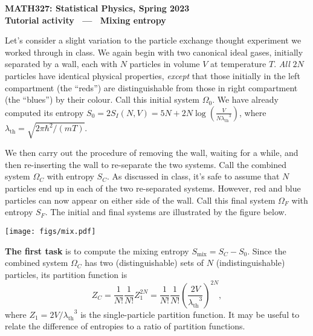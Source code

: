 \documentclass[12 pt]{article} %
\newcommand{\la}{\ensuremath{\lambda} }
\newcommand{\lath}{\ensuremath{\la_{\mathrm{th}}} }
\newcommand{\Om}{\ensuremath{\Omega} }
\begin{document}
\newcommand{\thisunit}{MATH327 Tutorial (Mixing)}
\newcommand{\moddate}{Last modified 8 Mar.~2023}
\begin{center}
  {\Large \textbf{MATH327: Statistical Physics, Spring 2023}} \\[12 pt]
  {\Large \textbf{Tutorial activity \ --- \ Mixing entropy}} \\[24 pt]
\end{center}

Let's consider a slight variation to the particle exchange thought experiment we worked through in class.
We again begin with two canonical ideal gases, initially separated by a wall, each with $N$ particles in volume $V$ at temperature $T$.
\textit{All} $2N$ particles have identical physical properties, \textit{except} that those initially in the left compartment (the ``reds'') are distinguishable from those in right compartment (the ``blues'') by their colour.
Call this initial system $\Om_0$.
We have already computed its entropy $S_0 = 2S_I(N, V) = 5N + 2N\log\left(\frac{V}{N\lath^3}\right)$, where $\lath = \sqrt{2\pi\hbar^2 / (mT)}$.

We then carry out the procedure of removing the wall, waiting for a while, and then re-inserting the wall to re-separate the two systems.
Call the combined system $\Om_C$ with entropy $S_C$.
As discussed in class, it's safe to assume that $N$ particles end up in each of the two re-separated systems.
However, red and blue particles can now appear on either side of the wall.
Call this final system $\Om_F$ with entropy $S_F$.
The initial and final systems are illustrated by the figure below.

\begin{center}\texttt{[image: figs/mix.pdf]}\end{center}

\textbf{The first task} is to compute the mixing entropy $S_{\text{mix}} = S_C - S_0$.
Since the combined system $\Om_C$ has two (distinguishable) sets of $N$ (indistinguishable) particles, its partition function is
\begin{equation*}
  Z_C = \frac{1}{N!} \frac{1}{N!} Z_1^{2N} = \frac{1}{N!} \frac{1}{N!} \left(\frac{2V}{\lath^3}\right)^{2N},
\end{equation*}
where $Z_1 = 2V / \lath^3$ is the single-particle partition function.
It may be useful to relate the difference of entropies to a ratio of partition functions.
\end{document}
